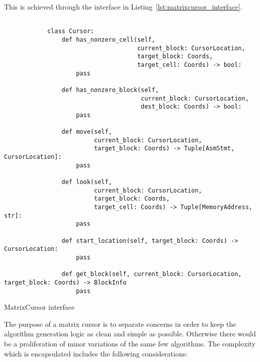     This is achieved through the interface in Listing~\ref{lst:matrixcursor_interface}.
    \begin{listing}
        \begin{verbatim}

            class Cursor:
                def has_nonzero_cell(self, 
                                     current_block: CursorLocation, 
                                     target_block: Coords, 
                                     target_cell: Coords) -> bool:
                    pass

                def has_nonzero_block(self, 
                                      current_block: CursorLocation, 
                                      dest_block: Coords) -> bool:
                    pass

                def move(self, 
                         current_block: CursorLocation, 
                         target_block: Coords) -> Tuple[AsmStmt, CursorLocation]:
                    pass

                def look(self, 
                         current_block: CursorLocation, 
                         target_block: Coords, 
                         target_cell: Coords) -> Tuple[MemoryAddress, str]:
                    pass

                def start_location(self, target_block: Coords) -> CursorLocation:
                    pass

                def get_block(self, current_block: CursorLocation, target_block: Coords) -> BlockInfo
                    pass
        \end{verbatim}
        \caption{MatrixCursor interface}
        \label{lst:matrixcursor_interface}
    \end{listing}

    The purpose of a matrix cursor is to separate concerns in order to keep the algorithm generation logic as clean and simple as possible. Otherwise there would be a proliferation of minor variations of the same few algorithms. The complexity which is encapsulated includes the following considerations:

